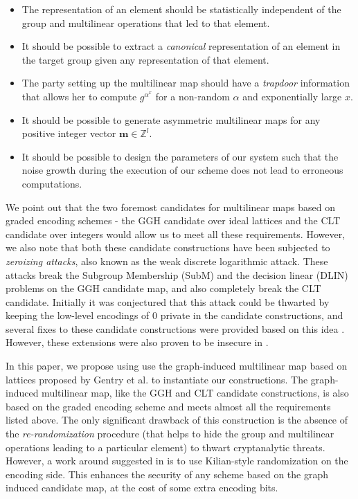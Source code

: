 \let\labelitemi\labelitemii

\begin{itemize}
 \item The representation of an element should be statistically independent of the group and multilinear operations that led to that element.\\
 \item It should be possible to extract a \emph{canonical} representation of an element in the target group given any representation of that element.\\
 \item The party setting up the multilinear map should have a \emph{trapdoor} information that allows her to compute $g^{\alpha^x}$ for a non-random $\alpha$ and exponentially large $x$.\\
 \item It should be possible to generate asymmetric multilinear maps for any positive integer vector $\mathbf{m}\in\mathbb{Z}^l$.\\
 \item It should be possible to design the parameters of our system such that the noise growth during the execution of our scheme does not lead to erroneous computations. 
\end{itemize}

We point out that the two foremost candidates for multilinear maps based on graded encoding schemes - the GGH candidate over ideal lattices \cite{garg2013candidate} and the CLT candidate over integers \cite{coron2013practical} would allow us to meet all these requirements. However, we also note that both these candidate constructions have been subjected to \emph{zeroizing attacks}\cite{cheon2015cryptanalysis}, also known as the weak discrete logarithmic attack. These attacks break the Subgroup Membership (SubM) and the decision linear (DLIN) problems on the GGH candidate map, and also completely break the CLT candidate. Initially it was conjectured that this attack could be thwarted by keeping the low-level encodings of $0$ private in the candidate constructions, and several fixes to these candidate constructions were provided based on this idea \cite{gentry2014zeroizing,boneh2014immunizing}. However, these extensions were also proven to be insecure in \cite{coron2014cryptanalysis}. 

In this paper, we propose using use the graph-induced multilinear map based on lattices proposed by Gentry et al. \cite{gentry2015graph} to instantiate our constructions. The graph-induced multilinear map, like the GGH and CLT candidate constructions, is also based on the graded encoding scheme and meets almost all the requirements listed above. The only significant drawback of this construction is the absence of the \emph{re-randomization} procedure (that helps to hide the group and multilinear operations leading to a particular element) to thwart cryptanalytic threats. However, a work around suggested in \cite{gentry2015graph} is to use Kilian-style randomization \cite{kilian1988founding} on the encoding side. This enhances the security of any scheme based on the graph induced candidate map, at the cost of some extra encoding bits.




